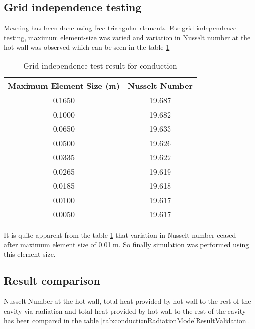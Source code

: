 \subsection{Grid independence testing}
Meshing has been done using free triangular elements. For grid independence testing, maximum element-size was varied and variation in Nusselt number at the hot wall was observed which can be seen in the table \ref{gridTestCond}. 


\begin{table}[H]
\centering
\caption{Grid independence test result for conduction}
\label{gridTestCond}
\begin{tabular}{@{}|c|c|@{}}
\toprule
\textbf{Maximum Element Size (m)} & \textbf{Nusselt Number} \\ \midrule
0.1650                            & 19.687                  \\ \midrule
0.1000                            & 19.682                  \\ \midrule
0.0650                            & 19.633                  \\ \midrule
0.0500                            & 19.626                  \\ \midrule
0.0335                            & 19.622                  \\ \midrule
0.0265                            & 19.619                  \\ \midrule
0.0185                            & 19.618                  \\ \midrule
0.0100                            & 19.617                  \\ \midrule
0.0050                            & 19.617                  \\ \bottomrule
\end{tabular}
\end{table}

It is quite apparent from the table \ref{gridTestCond} that variation in Nusselt number ceased after maximum element size of 0.01 m. So finally simulation was performed using this element size.

\subsection{Result comparison}
Nusselt Number at the hot wall, total heat provided by hot wall to the rest of the cavity via radiation and total heat provided by hot wall to the rest of the cavity has been compared in the table \ref{tab:conductionRadiationModelResultValidation}.


